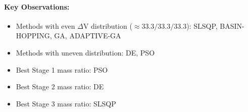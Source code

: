 \documentclass{article}
\begin{document}
\paragraph{Key Observations:}
\begin{itemize}
\item Methods with even $\Delta$V distribution ($\approx33.3/33.3/33.3$): SLSQP, BASIN-HOPPING, GA, ADAPTIVE-GA
\item Methods with uneven distribution: DE, PSO
\item Best Stage 1 mass ratio: PSO
\item Best Stage 2 mass ratio: DE
\item Best Stage 3 mass ratio: SLSQP
\end{itemize}
\end{document}
